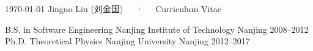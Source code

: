 \documentclass[11pt, a4paper]{awesome-cv}
\begin{document}
\makecvheader

\makecvfooter
  {\today}
  {Jinguo Liu (刘金国)~~~·~~~Curriculum Vitae}
  {\thepage}


\begin{cventries}
  \cventry
    {B.S. in Software Engineering}
    {Nanjing Institute of Technology}
    {Nanjing}
    {2008--2012}
    {}  %
  \cventry
    {Ph.D. Theoretical Physics}
    {Nanjing University}
    {Nanjing}
    {2012--2017}
    {}
\end{cventries}
\end{document}
